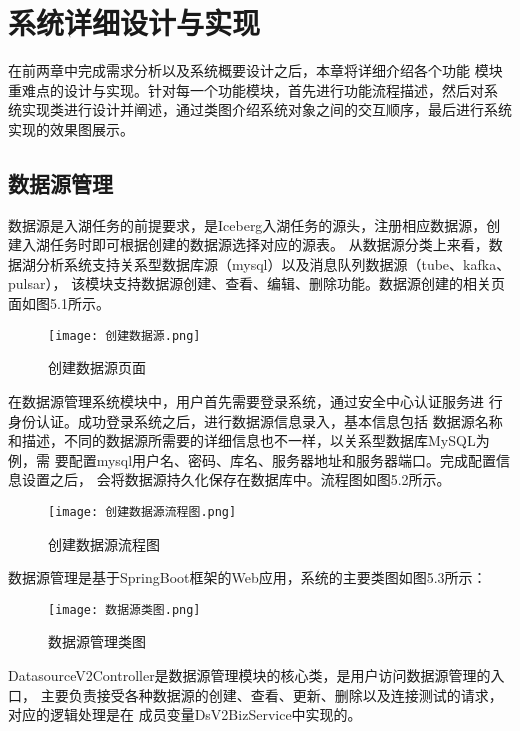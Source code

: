 
\chapter{系统详细设计与实现}

在前两章中完成需求分析以及系统概要设计之后，本章将详细介绍各个功能
模块重难点的设计与实现。针对每一个功能模块，首先进行功能流程描述，然后对系
统实现类进行设计并阐述，通过类图介绍系统对象之间的交互顺序，最后进行系统实现的效果图展示。

\section{数据源管理}

数据源是入湖任务的前提要求，是Iceberg入湖任务的源头，注册相应数据源，创建入湖任务时即可根据创建的数据源选择对应的源表。
从数据源分类上来看，数据湖分析系统支持关系型数据库源（mysql）以及消息队列数据源（tube、kafka、pulsar），
该模块支持数据源创建、查看、编辑、删除功能。数据源创建的相关页面如图5.1所示。

\begin{figure}[h]
  \centering
  \texttt{[image: 创建数据源.png]}
  \caption{创建数据源页面}
  \label{fig:badge}
\end{figure}

在数据源管理系统模块中，用户首先需要登录系统，通过安全中心认证服务进
行身份认证。成功登录系统之后，进行数据源信息录入，基本信息包括
数据源名称和描述，不同的数据源所需要的详细信息也不一样，以关系型数据库MySQL为例，需
要配置mysql用户名、密码、库名、服务器地址和服务器端口。完成配置信息设置之后，
会将数据源持久化保存在数据库中。流程图如图5.2所示。

\begin{figure}[h]
  \centering
  \texttt{[image: 创建数据源流程图.png]}
  \caption{创建数据源流程图}
  \label{fig:badge}
\end{figure}

数据源管理是基于SpringBoot框架的Web应用，系统的主要类图如图5.3所示：

\begin{figure}[h]
  \centering
  \texttt{[image: 数据源类图.png]}
  \caption{数据源管理类图}
  \label{fig:badge}
\end{figure}

DatasourceV2Controller是数据源管理模块的核心类，是用户访问数据源管理的入口，
主要负责接受各种数据源的创建、查看、更新、删除以及连接测试的请求，对应的逻辑处理是在
成员变量DsV2BizService中实现的。

